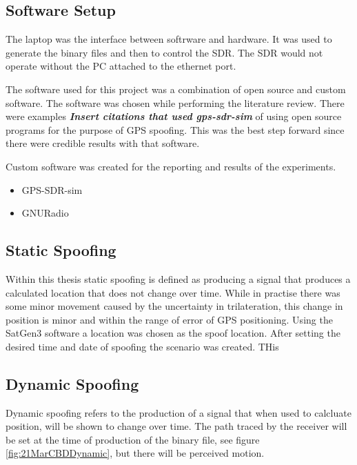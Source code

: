 \subsection{Software Setup}
The laptop was the interface between softrware and hardware. It was used to generate the binary files and then to control the SDR. The SDR would not operate without the
PC attached to the ethernet port.

The software used for this project was a combination of open source and custom software. 
The software was chosen while performing the literature review. There were examples \emph{\textbf{Insert citations that used gps-sdr-sim}} of using open source programs
for the purpose of GPS spoofing. This was the best step forward since there were credible results with that software.

Custom software was created for the reporting and results of the experiments. 

\begin{itemize}
    \item GPS-SDR-sim
    \item GNURadio
\end{itemize}

\subsection{Static Spoofing}
Within this thesis static spoofing is defined as producing a signal that produces a calculated location that does not change over time. While in practise there was some
minor movement caused by the uncertainty in trilateration, this change in position is minor and within the range of error of GPS positioning.
Using the SatGen3 software a location was chosen as the spoof location. After setting the desired time and date of spoofing the scenario was created. THis 

\subsection{Dynamic Spoofing}
Dynamic spoofing refers to the production of a signal that when used to calcluate position, will be shown to change over time. The path traced by the receiver will be
set at the time of production of the binary file, see figure \ref{fig:21MarCBDDynamic}, but there will be perceived motion.

